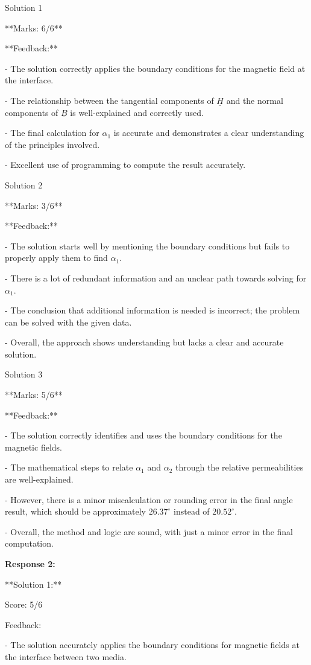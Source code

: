 \documentclass[a4paper,11pt]{article}
\begin{document}
Solution 1

**Marks: 6/6**

**Feedback:**

- The solution correctly applies the boundary conditions for the magnetic field at the interface.

- The relationship between the tangential components of \( \underline{H} \) and the normal components of \( \underline{B} \) is well-explained and correctly used.

- The final calculation for \( \alpha_{1} \) is accurate and demonstrates a clear understanding of the principles involved.

- Excellent use of programming to compute the result accurately.

Solution 2

**Marks: 3/6**

**Feedback:**

- The solution starts well by mentioning the boundary conditions but fails to properly apply them to find \( \alpha_{1} \).

- There is a lot of redundant information and an unclear path towards solving for \( \alpha_{1} \).

- The conclusion that additional information is needed is incorrect; the problem can be solved with the given data.

- Overall, the approach shows understanding but lacks a clear and accurate solution.

Solution 3

**Marks: 5/6**

**Feedback:**

- The solution correctly identifies and uses the boundary conditions for the magnetic fields.

- The mathematical steps to relate \( \alpha_{1} \) and \( \alpha_{2} \) through the relative permeabilities are well-explained.

- However, there is a minor miscalculation or rounding error in the final angle result, which should be approximately \( 26.37^\circ \) instead of \( 20.52^\circ \).

- Overall, the method and logic are sound, with just a minor error in the final computation.


\bigskip 
\textbf{Response 2:}

**Solution 1:**

Score: 5/6

Feedback:

- The solution accurately applies the boundary conditions for magnetic fields at the interface between two media.
\end{document}
